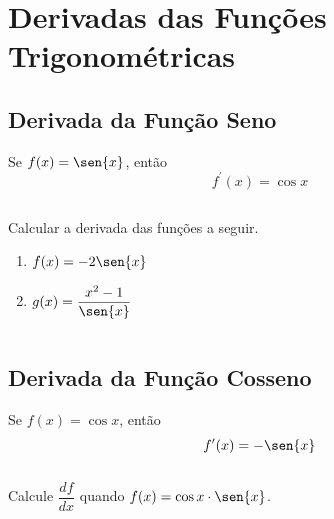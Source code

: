 \section{Derivadas das Funções Trigonométricas}
\subsection{Derivada da Função Seno}
\begin{frame}
  \begin{theorem}
    Se $f(x)=\sen{x}$, então
    \begin{equation*}
      f^{\prime}(x) = \cos{x}
    \end{equation*}
  \end{theorem}
  \begin{columns}[onlytextwidth]
    \begin{column}{0.49\textwidth}
      \begin{example-highlight}
        Calcular a derivada das funções a seguir.
        \begin{enumerate}
          \item $f(x)=-2\sen{x}$
          \item  $g(x)=\dfrac{x^{2}-1}{\sen{x}}$
        \end{enumerate}
      \end{example-highlight}
    \end{column}
    \begin{column}{0.49\textwidth}
    \end{column}
  \end{columns}
\end{frame}

\subsection{Derivada da Função Cosseno}
\begin{frame}
  \begin{theorem}
    Se $f(x)=\cos{x}$, então
    \begin{equation*}
      f^{\prime}(x) = -\sen{x}
    \end{equation*}
  \end{theorem}
  \begin{columns}[onlytextwidth]
    \begin{column}{0.5\textwidth}
      \begin{example-highlight}
        Calcule $\dfrac{df}{dx}$ quando $f(x)=\cos{x}\cdot\sen{x}$.
      \end{example-highlight}
    \end{column}
    \begin{column}{0.5\textwidth}
    \end{column}
  \end{columns}
\end{frame}

